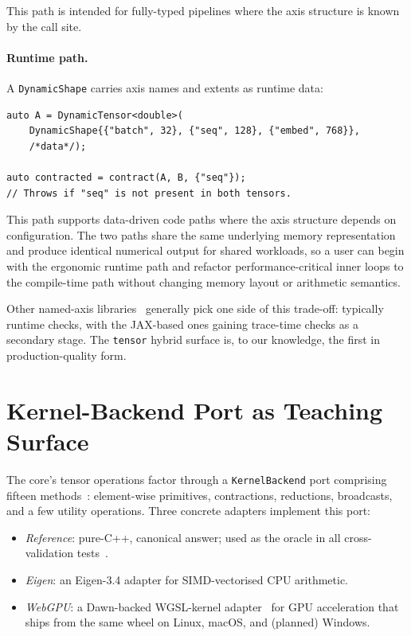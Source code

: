 \documentclass[11pt,a4paper]{article}
\begin{document}
This path is intended for fully-typed pipelines where the
axis structure is known by the call site.

\paragraph{Runtime path.} A \texttt{DynamicShape} carries axis
names and extents as runtime data:

\begin{lstlisting}
auto A = DynamicTensor<double>(
    DynamicShape{{"batch", 32}, {"seq", 128}, {"embed", 768}},
    /*data*/);

auto contracted = contract(A, B, {"seq"});
// Throws if "seq" is not present in both tensors.
\end{lstlisting}

This path supports data-driven code paths where the axis
structure depends on configuration. The two paths share the same
underlying memory representation and produce identical numerical
output for shared workloads, so a user can begin with the
ergonomic runtime path and refactor performance-critical inner
loops to the compile-time path without changing memory layout or
arithmetic semantics.

Other named-axis libraries~\cite{Haliax2024,Penzai2024,einx2026}
generally pick one side of this trade-off: typically runtime
checks, with the JAX-based ones gaining trace-time checks as a
secondary stage. The \texttt{tensor} hybrid surface is, to our
knowledge, the first in production-quality form.

\section{Kernel-Backend Port as Teaching Surface}
\label{sec:kernel-port}

The core's tensor operations factor through a
\texttt{KernelBackend} port comprising fifteen
methods~\cite{tensorADR0011}: element-wise primitives,
contractions, reductions, broadcasts, and a few utility
operations. Three concrete adapters implement this port:

\begin{itemize}
\item \emph{Reference}: pure-C++, canonical answer; used as the
oracle in all cross-validation tests~\cite{tensorADR0009}.
\item \emph{Eigen}: an Eigen-3.4 adapter for SIMD-vectorised CPU
arithmetic.
\item \emph{WebGPU}: a Dawn-backed WGSL-kernel
adapter~\cite{tensorADR0006,tensorADR0016} for GPU acceleration
that ships from the same wheel on Linux, macOS,
and (planned) Windows.
\end{itemize}
\end{document}
